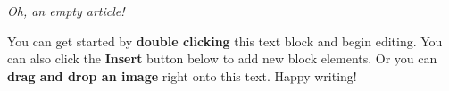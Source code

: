 \textit{Oh, an empty article!} 

You can get started by \textbf{double clicking} this text block and begin editing. You can also click the \textbf{Insert} button below to add new block elements. Or you can \textbf{drag and drop an image} right onto this text. Happy writing!


\cite{doi:10.1056/NEJMoa064135}
